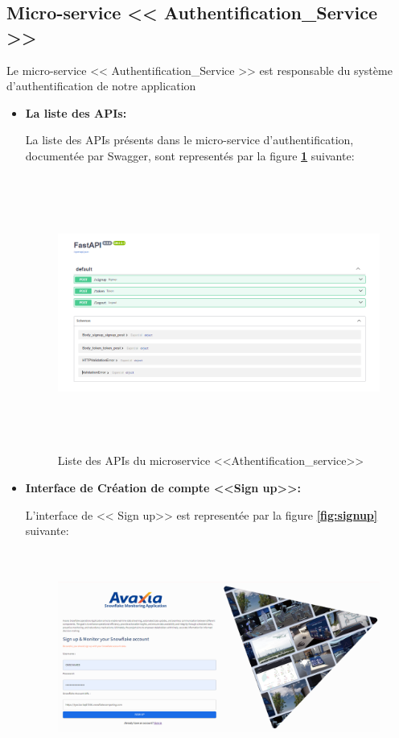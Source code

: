 \subsection{Micro-service << Authentification\_Service >>}
\par Le micro-service << Authentification\_Service >> est responsable du système d'authentification de notre application 
\begin{itemize}
    \item \textbf{La liste des APIs:}
        \par La liste des APIs présents dans le micro-service d'authentification, documentée par Swagger, sont representés par la figure \textbf{\ref{fig:apiAuth}} suivante:
        \begin{figure}[H]
            \centering
            \includegraphics[width =1\linewidth, height=9cm]{img/captures/auth_apis.PNG}
            \caption{Liste des APIs du microservice <<Athentification\_service>> }
                \label{fig:apiAuth}
        \end{figure}
        \item \textbf{Interface de Création de compte <<Sign up>>:}
        \par L'interface de << Sign up>> est representée par la figure \textbf{\ref{fig:signup}} suivante:
        \begin{figure}[H]
            \centering
            \includegraphics[width =1\linewidth, height=7cm]{img/captures/auth/signup.png}

\end{figure}
\end{itemize}
